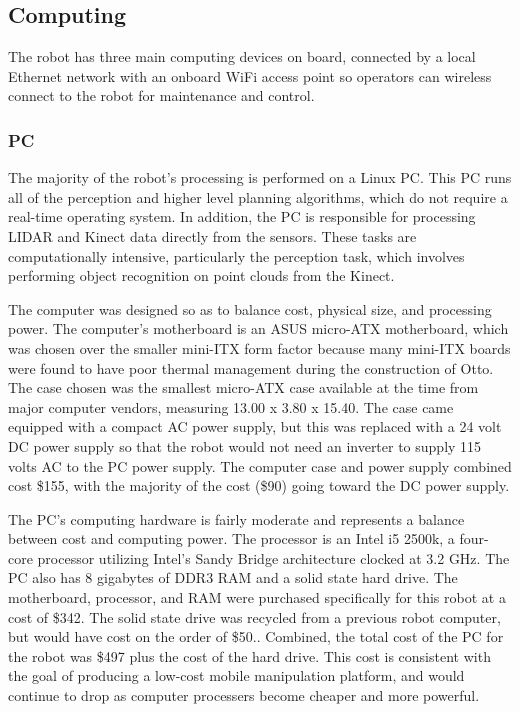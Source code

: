\documentclass{cwru}
\begin{document}
\subsection[Computing]{Computing}
The robot has three main computing devices on board, connected by a local Ethernet network with an onboard WiFi access point so operators can wireless connect to the robot for maintenance and control.

\subsubsection[PC]{PC}
The majority of the robot{\textquoteright}s processing is performed on a Linux PC. This PC runs all of the perception and higher level planning algorithms, which do not require a real-time operating system. In addition, the PC is responsible for processing LIDAR and Kinect data directly from the sensors. These tasks are computationally intensive, particularly the perception task, which involves performing object recognition on point clouds from the Kinect.

The computer was designed so as to balance cost, physical size, and processing power. The computer{\textquoteright}s motherboard is an ASUS micro-ATX motherboard, which was chosen over the smaller mini-ITX form factor because many mini-ITX boards were found to have poor thermal management during the construction of Otto. The case chosen was the smallest micro-ATX case available at the time from major computer vendors, measuring 13.00{\textquotedbl} x 3.80{\textquotedbl} x 15.40{\textquotedbl}. The case came equipped with a compact AC power supply, but this was replaced with a 24 volt DC power supply so that the robot would not need an inverter to supply 115 volts AC to the PC power supply. The computer case and power supply combined cost \$155, with the majority of the cost (\$90) going toward the DC power supply.

The PC{\textquoteright}s computing hardware is fairly moderate and represents a balance between cost and computing power. The processor is an Intel i5 2500k, a four-core processor utilizing Intel{\textquoteright}s Sandy Bridge architecture clocked at 3.2 GHz. The PC also has 8 gigabytes of DDR3 RAM and a solid state hard drive. The motherboard, processor, and RAM were purchased specifically for this robot at a cost of \$342. The solid state drive was recycled from a previous robot computer, but would have cost on the order of \$50.. Combined, the total cost of the PC for the robot was \$497 plus the cost of the hard drive. This cost is consistent with the goal of producing a low-cost mobile manipulation platform, and would continue to drop as computer processers become cheaper and more powerful.
\end{document}
